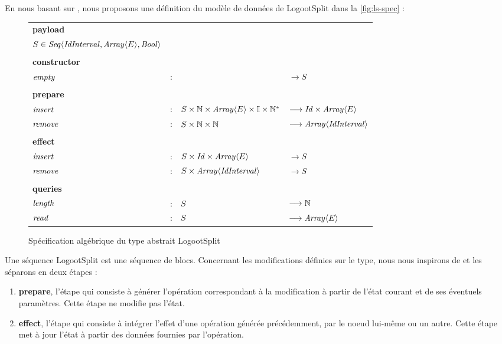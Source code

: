 En nous basant sur \textcite{2013-logootsplit}, nous proposons une définition du modèle de données de LogootSplit dans la \autoref{fig:ls-spec} :

\begin{figure}[!ht]
  \centering
    \begin{tabular}{llll}
      \textbf{payload} \\
      $S \in \mathit{Seq}\langle \mathit{IdInterval},\mathit{Array}\langle E \rangle, \mathit{Bool} \rangle$ \\
      \\
      \textbf{constructor} \\
      $\mathit{empty}$ & : &                                                 & $\longrightarrow S$   \\
      \\
      \textbf{prepare} \\
      $\mathit{insert}$ & : & $S \times \mathbb{N} \times \mathit{Array}\langle E \rangle \times \mathbb{I} \times \mathbb{N}^*$   & $\longrightarrow \mathit{Id} \times \mathit{Array}\langle E \rangle$   \\
      $\mathit{remove}$ & : & $S \times \mathbb{N} \times \mathbb{N}$                           & $\longrightarrow \mathit{Array}\langle \mathit{IdInterval} \rangle$ \\
      \\
      \textbf{effect} \\
      $\mathit{insert}$ & : & $S \times \mathit{Id} \times \mathit{Array}\langle E \rangle$ & $\longrightarrow S$ \\
      $\mathit{remove}$ & : & $S \times \mathit{Array}\langle \mathit{IdInterval} \rangle$  & $\longrightarrow S$ \\
      \\
      \textbf{queries} \\
      $\mathit{length}$ & : & $S$                                             & $\longrightarrow \mathbb{N}$   \\
      $\mathit{read}$  & : & $S$                                             & $\longrightarrow \mathit{Array}\langle E \rangle$ \\
    \end{tabular}
  \caption{Spécification algébrique du type abstrait LogootSplit}
  \label{fig:ls-spec}
\end{figure}

Une séquence LogootSplit est une séquence de blocs.
Concernant les modifications définies sur le type, nous nous inspirons de \cite{baquero2017pure} et les séparons en deux étapes :
\begin{enumerate}
  \item \textbf{prepare}, l'étape qui consiste à générer l'opération correspondant à la modification à partir de l'état courant et de ses éventuels paramètres.
    Cette étape ne modifie pas l'état.
  \item \textbf{effect}, l'étape qui consiste à intégrer l'effet d'une opération générée précédemment, par le noeud lui-même ou un autre.
    Cette étape met à jour l'état à partir des données fournies par l'opération.
\end{enumerate}

